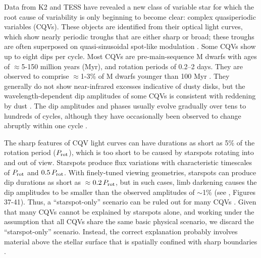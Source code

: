 \documentclass[11pt,twocolumn,tighten]{aastex63}
\begin{document}
Data from K2 \citep{2014PASP..126..398H} and TESS
\citep{2015JATIS...1a4003R} have revealed a new class of variable
star for which the root cause of variability is only beginning to
become clear: complex quasiperiodic variables (CQVs).  These objects
are identified from their optical light curves, which show nearly
periodic troughs that are either sharp or broad; these troughs are
often superposed on quasi-sinusoidal spot-like modulation
\citep{2017AJ....153..152S,2018AJ....155...63S,2019ApJ...876..127Z}.
Some CQVs show up to eight dips per cycle.  Most CQVs are
pre-main-sequence M dwarfs with ages of $\approx$5-150 million years
(Myr), and rotation periods of 0.2--2 days.  They are observed to
comprise $\approx$1-3\% of M dwarfs younger than 100 Myr
\citep{2016AJ....152..114R,2022AJ....163..144G}.  They generally do
not show near-infrared excesses indicative of dusty disks, but the
wavelength-dependent dip amplitudes of some CQVs is consistent with
reddening by dust
\citep{2017PASJ...69L...2O,2020AJ....160...86B,2022AJ....163..144G,2023MNRAS.518.2921K}.
The dip amplitudes and phases usually evolve gradually over tens to
hundreds of cycles, although they have occasionally been observed to
change abruptly within one cycle
\citep[e.g.][]{2017AJ....153..152S,2022ApJ...925...75P,2023ApJ...945..114P}.

The sharp features of CQV light curves can have durations as short as
5\% of the rotation period ($P_{\rm rot}$), which is too short to be
caused by starspots rotating into and out of view.  Starspots produce
flux variations with characteristic timescales of $P_{\rm rot}$ and
$0.5\,P_{\rm rot}$.  With finely-tuned viewing geometries, starspots
can produce dip durations as short as $\approx$$0.2\,P_{\rm rot}$, but
in such cases, limb darkening causes the dip amplitudes to be smaller
than the observed amplitudes of $\sim$1\% (see
\citealt{2017AJ....153..152S}, Figures 37-41).  Thus, a
``starspot-only'' scenario can be ruled out for many CQVs
\citep{2017AJ....153..152S,2019ApJ...876..127Z,2021MNRAS.500.1366K}.
Given that many CQVs cannot be explained by starspots alone, and
working under the assumption that all CQVs share the same basic
physical scenario, we discard the ``starspot-only'' scenario.
Instead, the correct explanation probably involves material above the
stellar surface that is spatially confined with sharp boundaries
\citep[e.g.][]{2017AJ....153..152S,2022AJ....163..144G}.
\end{document}
